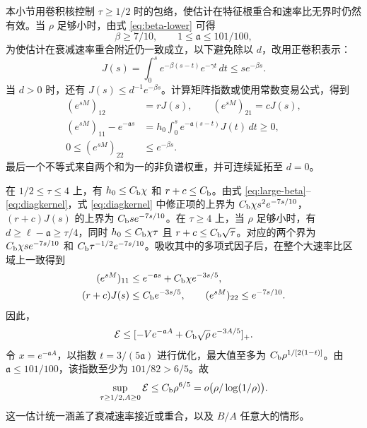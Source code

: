 \documentclass[aps,pra,reprint,amsmath,amssymb,nofootinbib,floatfix,longbibliography]{revtex4-2}
\theoremstyle{aps}
\begin{document}
本小节用卷积核控制 $\tau\ge1/2$ 时的包络，使估计在特征根重合和速率比无界时仍然有效。当 $\rho$ 足够小时，由式 \eqref{eq:beta-lower} 可得
\begin{equation}\label{eq:large-beta}
 \beta\ge7/10,\qquad 1\le\mathfrak a\le101/100,
\end{equation}
为使估计在衰减速率重合附近仍一致成立，以下避免除以 $d$，改用正卷积表示：
\begin{equation}\label{eq:Jkernel}
 J(s)=\int_0^s e^{-\beta(s-t)}e^{-\gamma t}\,dt
 \le s e^{-\beta s}.
\end{equation}
当 $d>0$ 时，还有 $J(s)\le d^{-1}e^{-\beta s}$。计算矩阵指数或使用常数变易公式，得到
\begin{align}
 (e^{sM})_{12}&=rJ(s),\qquad (e^{sM})_{21}=cJ(s),\label{eq:offdiag}\\
 (e^{sM})_{11}-e^{-\mathfrak a s}
 &=h_0\int_0^s e^{-\mathfrak a(s-t)}J(t)\,dt\ge0,\label{eq:diagkernel}\\
 0\le(e^{sM})_{22}&\le e^{-\beta s}.\label{eq:diag22}
\end{align}
最后一个不等式来自两个和为一的非负谱权重，并可连续延拓至 $d=0$。

在 $1/2\le\tau\le4$ 上，有 $h_0\le C_{\rm b}\chi$ 和 $r+c\le C_{\rm b}$。由式 \eqref{eq:large-beta}--\eqref{eq:diagkernel}，式 \eqref{eq:diagkernel} 中修正项的上界为 $C_{\rm b}\chi s^2e^{-7s/10}$，$(r+c)J(s)$ 的上界为 $C_{\rm b}se^{-7s/10}$。在 $\tau\ge4$ 上，当 $\rho$ 足够小时，有
$d\ge\ell-\mathfrak a\ge\tau/4$，同时 $h_0\le C_{\rm b}\chi\tau$ 且 $r+c\le C_{\rm b}\sqrt\tau$。对应的两个界为 $C_{\rm b}\chi s e^{-7s/10}$ 和 $C_{\rm b}\tau^{-1/2}e^{-7s/10}$。吸收其中的多项式因子后，在整个大速率比区域上一致得到
\begin{equation}\label{eq:large-elements}
 \begin{split}
 (e^{sM})_{11}&\le e^{-\mathfrak a s}+C_{\rm b}\chi e^{-3s/5},\\
 (r+c)J(s)&\le C_{\rm b}e^{-3s/5},\qquad
 (e^{sM})_{22}\le e^{-7s/10}.
 \end{split}
\end{equation}
因此，
\begin{equation}\label{eq:large-envelope}
 \mathcal E\le[-Ve^{-\mathfrak a A}+C_{\rm b}\sqrt\rho\,e^{-3A/5}]_+.
\end{equation}
令 $x=e^{-\mathfrak a A}$，以指数 $t=3/(5\mathfrak a)$ 进行优化，最大值至多为 $C_{\rm b}\rho^{1/[2(1-t)]}$。由 $\mathfrak a\le101/100$，该指数至少为 $101/82>6/5$。故
\begin{equation}\label{eq:large-final}
 \sup_{\tau\ge1/2,A\ge0}\mathcal E\le C_{\rm b}\rho^{6/5}
 =o\bigl(\rho/\log(1/\rho)\bigr).
\end{equation}
这一估计统一涵盖了衰减速率接近或重合，以及 $B/A$ 任意大的情形。
\end{document}
